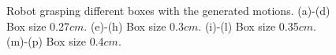 \begin{figure}
  \hspace{-2.2cm}
  \begin{minipage}[c]{1\textwidth}
  \end{minipage}

  \caption{ \scriptsize{Robot grasping different boxes with the generated motions.
  (a)-(d) Box size 0.27$cm$. (e)-(h) Box size 0.3$cm$. (i)-(l) Box size 0.35$cm$. (m)-(p) Box size 0.4$cm$.}
}
    \vspace{-0.5cm}
    \label{graspdemo2}
\end{figure}


